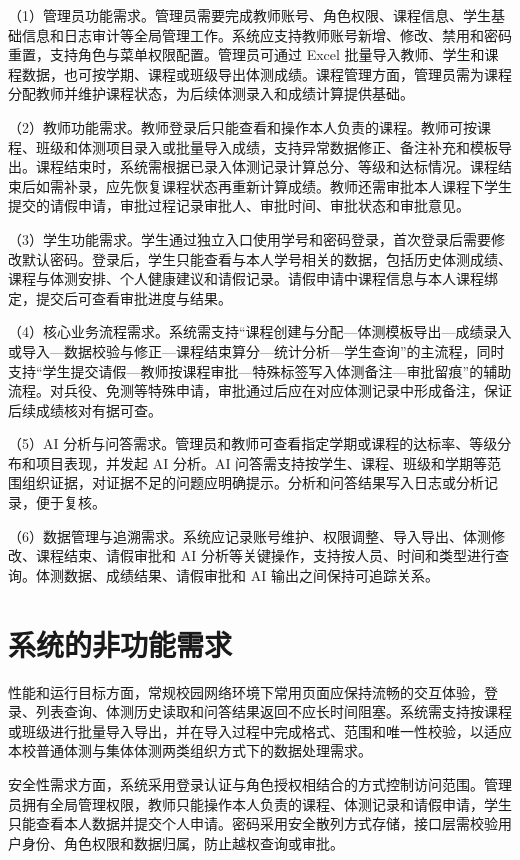 （1）管理员功能需求。管理员需要完成教师账号、角色权限、课程信息、学生基础信息和日志审计等全局管理工作。系统应支持教师账号新增、修改、禁用和密码重置，支持角色与菜单权限配置。管理员可通过 Excel 批量导入教师、学生和课程数据，也可按学期、课程或班级导出体测成绩。课程管理方面，管理员需为课程分配教师并维护课程状态，为后续体测录入和成绩计算提供基础。

（2）教师功能需求。教师登录后只能查看和操作本人负责的课程。教师可按课程、班级和体测项目录入或批量导入成绩，支持异常数据修正、备注补充和模板导出。课程结束时，系统需根据已录入体测记录计算总分、等级和达标情况。课程结束后如需补录，应先恢复课程状态再重新计算成绩。教师还需审批本人课程下学生提交的请假申请，审批过程记录审批人、审批时间、审批状态和审批意见。

（3）学生功能需求。学生通过独立入口使用学号和密码登录，首次登录后需要修改默认密码。登录后，学生只能查看与本人学号相关的数据，包括历史体测成绩、课程与体测安排、个人健康建议和请假记录。请假申请中课程信息与本人课程绑定，提交后可查看审批进度与结果。

（4）核心业务流程需求。系统需支持“课程创建与分配—体测模板导出—成绩录入或导入—数据校验与修正—课程结束算分—统计分析—学生查询”的主流程，同时支持“学生提交请假—教师按课程审批—特殊标签写入体测备注—审批留痕”的辅助流程。对兵役、免测等特殊申请，审批通过后应在对应体测记录中形成备注，保证后续成绩核对有据可查。

（5）AI 分析与问答需求。管理员和教师可查看指定学期或课程的达标率、等级分布和项目表现，并发起 AI 分析。AI 问答需支持按学生、课程、班级和学期等范围组织证据，对证据不足的问题应明确提示。分析和问答结果写入日志或分析记录，便于复核。

（6）数据管理与追溯需求。系统应记录账号维护、权限调整、导入导出、体测修改、课程结束、请假审批和 AI 分析等关键操作，支持按人员、时间和类型进行查询。体测数据、成绩结果、请假审批和 AI 输出之间保持可追踪关系。

\section{系统的非功能需求}

性能和运行目标方面，常规校园网络环境下常用页面应保持流畅的交互体验，登录、列表查询、体测历史读取和问答结果返回不应长时间阻塞。系统需支持按课程或班级进行批量导入导出，并在导入过程中完成格式、范围和唯一性校验，以适应本校普通体测与集体体测两类组织方式下的数据处理需求。

安全性需求方面，系统采用登录认证与角色授权相结合的方式控制访问范围。管理员拥有全局管理权限，教师只能操作本人负责的课程、体测记录和请假申请，学生只能查看本人数据并提交个人申请。密码采用安全散列方式存储，接口层需校验用户身份、角色权限和数据归属，防止越权查询或审批。

